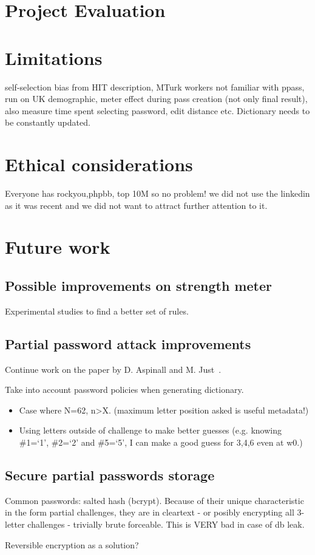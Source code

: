   \section{Project Evaluation}
    \label{sec:evaluation}

  \section{Limitations}
    \label{sec:limitations}
    self-selection bias from HIT description, MTurk workers not familiar with ppass, run on UK demographic, meter effect during pass creation (not only final result), also measure time spent selecting password, edit distance etc. Dictionary needs to be constantly updated.

  \section{Ethical considerations}
    \label{sec:ethical}
    Everyone has rockyou,phpbb, top 10M so no problem! we did not use the linkedin as it was recent and we did not want to attract further attention to it.

  \section{Future work}
    \label{sec:future_work}

    \subsection{Possible improvements on strength meter}
      \label{ssec:meter_improvements}
      Experimental studies to find a better set of rules.

    \subsection{Partial password attack improvements}
      \label{ssec:attack_improvements}
      Continue work on the paper by D. Aspinall and M. Just~\cite{part_pass}.

      Take into account password policies when generating dictionary.

      \begin{itemize}
        \item Case where N=62, n>X. (maximum letter position asked is useful metadata!)
        \item Using letters outside of challenge to make better guesses (e.g. knowing \#1=`1', \#2=`2' and \#5=`5', I can make a good guess for 3,4,6 even at w0.)
      \end{itemize}

    \subsection{Secure partial passwords storage}
      \label{ssec:secure_store}
      Common passwords: salted hash (bcrypt). Because of their unique characteristic in the form partial challenges, they are in cleartext - or posibly encrypting all 3-letter challenges - trivially brute forceable. This is VERY bad in case of db leak.

      Reversible encryption as a solution?